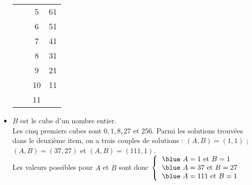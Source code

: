 \begin{itemize}
\begin{tabular}{|C{0.8}|c|C{0.8}|C{0.8}|}
            & & 5 & 61 \\
            & & 6 & 51 \\
            & & 7 & 41 \\
            & & 8 & 31 \\
            & & 9 & 21 \\
            & & 10 & 11 \\
            & & 11 & {} \\
            \hline
         \end{tabular}
         \bigskip
      \item $B$ est le cube d'un nombre entier. \\
         Les cinq premiers cubes sont $0, 1, 8, 27$ et $256$. Parmi les solutions trouvées dans le deuxième item, on a trois couples de solutions : $(A,B) =(1,1)$ \quad ; \quad $(A,B) =(37,27)$ \quad et \quad $(A,B) =(111,1)$. \\
         Les valeurs possibles pour  $A$ et $B$ sont donc $\left\{\begin{tabular}{l}
           {\blue  $A=1$ et $B=1$} \\ {\blue $A =37$ et $B=27$} \\ {\blue $A =111$ et $B =1$}  \\
         \end{tabular}\right.$
   \end{itemize}
